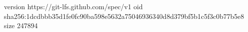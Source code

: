 version https://git-lfs.github.com/spec/v1
oid sha256:1dcdbbb35d1fe0fc90ba598e5632a75046936340d8d379bf5b1c5f3c0b77b5e8
size 247894
